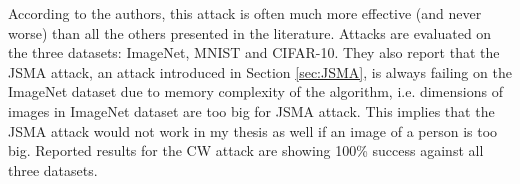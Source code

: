 According to the authors, this attack is often much more effective (and never worse) than all the others presented in the literature. Attacks are evaluated on the three datasets: ImageNet, MNIST and CIFAR-10. They also report that the JSMA attack, an attack introduced in Section \ref{sec:JSMA}, is always failing on the ImageNet dataset due to memory complexity of the algorithm, i.e. dimensions of images in ImageNet dataset are too big for JSMA attack. This implies that the JSMA attack would not work in my thesis as well if an image of a person is too big. Reported results for the CW attack are showing 100\% success against all three datasets.







